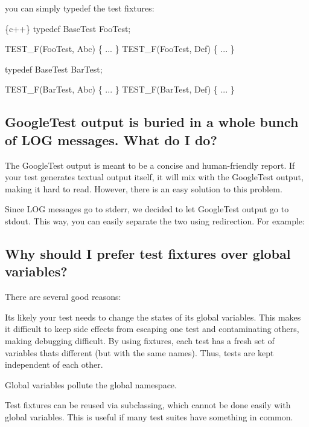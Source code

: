 you can simply {\ttfamily typedef} the test fixtures\+:


\begin{DoxyCode}
\{c++\}
typedef BaseTest FooTest;

TEST\_F(FooTest, Abc) \{ ... \}
TEST\_F(FooTest, Def) \{ ... \}

typedef BaseTest BarTest;

TEST\_F(BarTest, Abc) \{ ... \}
TEST\_F(BarTest, Def) \{ ... \}
\end{DoxyCode}


\subsection*{Google\+Test output is buried in a whole bunch of L\+OG messages. What do I do?}

The Google\+Test output is meant to be a concise and human-\/friendly report. If your test generates textual output itself, it will mix with the Google\+Test output, making it hard to read. However, there is an easy solution to this problem.

Since {\ttfamily L\+OG} messages go to stderr, we decided to let Google\+Test output go to stdout. This way, you can easily separate the two using redirection. For example\+:




\subsection*{Why should I prefer test fixtures over global variables?}

There are several good reasons\+:


\begin{DoxyEnumerate}
\item It\textquotesingle{}s likely your test needs to change the states of its global variables. This makes it difficult to keep side effects from escaping one test and contaminating others, making debugging difficult. By using fixtures, each test has a fresh set of variables that\textquotesingle{}s different (but with the same names). Thus, tests are kept independent of each other.
\item Global variables pollute the global namespace.
\item Test fixtures can be reused via subclassing, which cannot be done easily with global variables. This is useful if many test suites have something in common.
\end{DoxyEnumerate}

